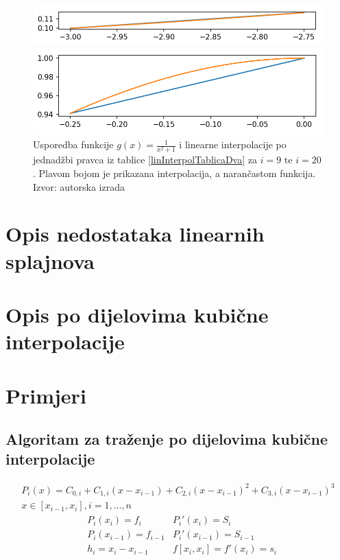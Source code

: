 \documentclass[12pt,a4paper]{report}
\begin{document}
			\begin{figure}[H]
				\centering
				
					\includegraphics[width=\textwidth]{slike/usporedba58.png}
				
					\includegraphics[width=\textwidth]{slike/usporedba519.png}
				
				\caption{Usporedba funkcije $g(x)=\frac{1}{x^2 +1}$ i linearne interpolacije po jednadžbi pravca iz tablice \ref{linInterpolTablicaDva} za $i=9$ te $i=20$. Plavom bojom je prikazana interpolacija, a narančastom funkcija. Izvor: autorska izrada}
				\label{linInterSlika2}
			\end{figure}
			
			
			
	\section{Opis nedostataka linearnih splajnova}
	\section{Opis po dijelovima kubične interpolacije}
	\section{Primjeri}
		\subsection{Algoritam za traženje po dijelovima kubične interpolacije}

		\begin{align*}
		P_i(x)=C_{0,i}+C_{1,i}(x-x_{i-1})+C_{2,i}(x-x_{i-1})^2+C_{3,i}(x-x_{i-1})^3 \\
		x\in[x_{i-1}, x_i], i=1,...,n
		\end{align*}
		\begin{align*}
			&P_i(x_i)=f_i &P_i'(x_i)=S_i\\
			&P_i(x_{i-1})=f_{i-1} &P_i'(x_{i-1})=S_{i-1}\\
			&h_i=x_i-x_{i-1} &f[x_i, x_i]=f'(x_i)=s_i
		\end{align*}
\end{document}

